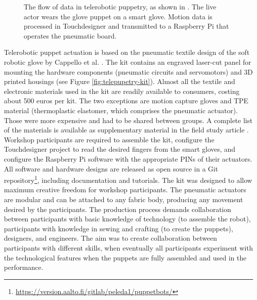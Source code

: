 \documentclass[dissertation,math,vertlayout,pdfa,colorlinks]{aaltoseries}
\begin{document}
\begin{figure}
    \centering
    
    \caption{The flow of data in telerobotic puppetry, as shown in \cite{peledTeleroboticTheaterOppressed2025}. The live actor wears the glove puppet on a smart glove. Motion data is processed in Touchdesigner and transmitted to a Raspberry Pi that operates the pneumatic board.}
    \label{fig:telepuppetry-diagram}
\end{figure}

Telerobotic puppet actuation is based on the pneumatic textile design of the soft robotic glove by Cappello et al. \cite{cappelloExploitingTextileMechanical2018,cappelloAssistingHandFunction2018}. The kit contains an engraved laser-cut panel for mounting the hardware components (pneumatic circuits and servomotors) and 3D printed housings (see Figure \ref{fig:telepupetry-kit}). Almost all the textile and electronic materials used in the kit are readily available to consumers, costing about 500 euros per kit. The two exceptions are motion capture gloves and TPE material (thermoplastic elastomer, which comprises the pneumatic actuator). Those were more expensive and had to be shared between groups. A complete list of the materials is available as supplementary material in the field study article \cite{peledTeleroboticTheaterOppressed2025}. Workshop participants are required to assemble the kit, configure the Touchdesigner project to read the desired fingers from the smart gloves, and configure the Raspberry Pi software with the appropriate PINs of their actuators. All software and hardware designs are released as open source in a Git repository\footnote{\url{https://version.aalto.fi/gitlab/peleda1/puppetbots/}}, including documentation and tutorials. The kit was designed to allow maximum creative freedom for workshop participants. The pneumatic actuators are modular and can be attached to any fabric body, producing any movement desired by the participants. The production process demands collaboration between participants with basic knowledge of technology (to assemble the robot), participants with knowledge in sewing and crafting (to create the puppets), designers, and engineers. The aim was to create collaboration between participants with different skills, when eventually all participants experiment with the technological features when the puppets are fully assembled and used in the performance.
\end{document}

